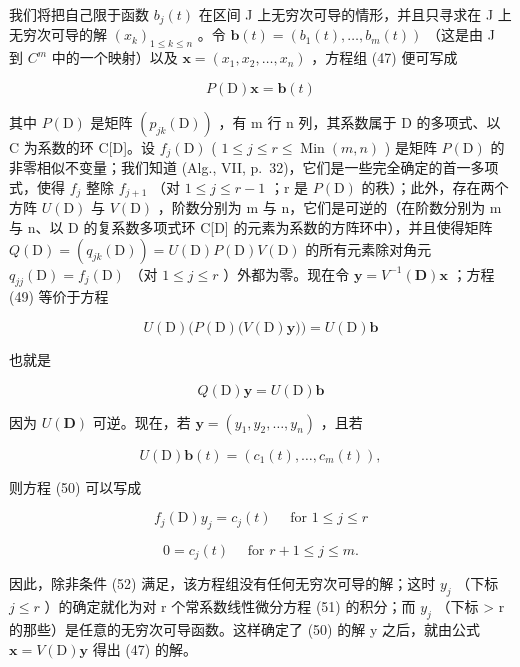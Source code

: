 我们将把自己限于函数 \(b_{j}(t)\) 在区间 J 上无穷次可导的情形，并且只寻求在 J 上无穷次可导的解 \((x_{k})_{1\leqslant k\leqslant n}\) 。令 \(\mathbf{b}(t)=\left(b_{1}(t),\ldots,b_{m}(t)\right)\) （这是由 J 到 \(C^{m}\) 中的一个映射）以及 \(\mathbf{x}=\left(x_{1},x_{2},\ldots,x_{n}\right)\) ，方程组 (47) 便可写成

\[
P (\mathrm{D}) \mathbf {x} = \mathbf {b} (t)\tag{49}
\]

其中 \(P(\mathrm{D})\) 是矩阵 \((p_{jk}(\mathrm{D}))\) ，有 m 行 n 列，其系数属于 D 的多项式、以 C 为系数的环 C{[}D{]}。设 \(f_{j}(\mathrm{D})\) ( \(1 \leqslant j \leqslant r \leqslant \operatorname{Min}(m, n)\) ) 是矩阵 \(P(\mathrm{D})\) 的非零相似不变量；我们知道 (Alg., VII, p.~32)，它们是一些完全确定的首一多项式，使得 \(f_{j}\) 整除 \(f_{j+1}\) （对 \(1 \leqslant j \leqslant r - 1\) ；r 是 \(P(\mathrm{D})\) 的秩）；此外，存在两个方阵 \(U(\mathrm{D})\) 与 \(V(\mathrm{D})\) ，阶数分别为 m 与 n，它们是可逆的（在阶数分别为 m 与 n、以 D 的复系数多项式环 C{[}D{]} 的元素为系数的方阵环中），并且使得矩阵 \(Q(\mathrm{D}) = (q_{jk}(\mathrm{D})) = U(\mathrm{D}) P(\mathrm{D}) V(\mathrm{D})\) 的所有元素除对角元 \(q_{jj}(\mathrm{D}) = f_{j}(\mathrm{D})\) （对 \(1 \leqslant j \leqslant r\) ）外都为零。现在令 \(\mathbf{y} = V^{-1}(\mathbf{D})\mathbf{x}\) ；方程 (49) 等价于方程

\[
U (\mathrm{D}) \big (P (\mathrm{D}) \big (V (\mathrm{D}) \mathbf {y} \big) \big) = U (\mathrm{D}) \mathbf {b}
\]

也就是

\[
Q (\mathrm{D}) \mathbf {y} = U (\mathrm{D}) \mathbf {b}\tag{50}
\]

因为 \(U(\mathbf{D})\) 可逆。现在，若 \(\mathbf{y} = (y_1, y_2, \ldots, y_n)\) ，且若

\[
U (\mathrm{D}) \mathbf {b} (t) = \left(c _ {1} (t), \dots , c _ {m} (t)\right),
\]

则方程 (50) 可以写成

\[
f _ {j} (\mathrm{D}) y _ {j} = c _ {j} (t) \quad \text {   for   } 1 \leqslant j \leqslant r\tag{51}
\]

\[
0 = c _ {j} (t) \quad \text {   for   } r + 1 \leqslant j \leqslant m.\tag{52}
\]

因此，除非条件 (52) 满足，该方程组没有任何无穷次可导的解；这时 \(y_{j}\) （下标 \(j \leqslant r\) ）的确定就化为对 r 个常系数线性微分方程 (51) 的积分；而 \(y_{j}\) （下标 \textgreater{} r 的那些）是任意的无穷次可导函数。这样确定了 (50) 的解 y 之后，就由公式 \(\mathbf{x} = V(\mathrm{D})\mathbf{y}\) 得出 (47) 的解。

